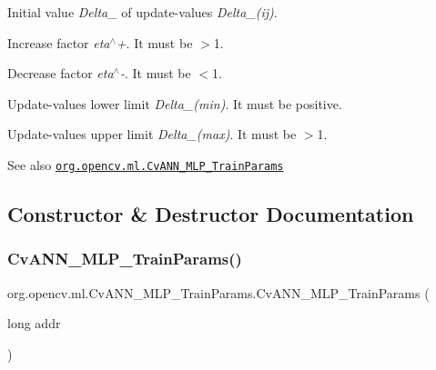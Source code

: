 {\ttfamily }

{\ttfamily }

{\ttfamily Initial value {\itshape Delta\+\_} of update-\/values {\itshape Delta\+\_\+(ij)}.}

{\ttfamily }

{\ttfamily }

{\ttfamily Increase factor {\itshape eta$^\wedge$+}. It must be $>$1.}

{\ttfamily }

{\ttfamily }

{\ttfamily Decrease factor {\itshape eta$^\wedge$-\/}. It must be $<$1.}

{\ttfamily }

{\ttfamily }

{\ttfamily Update-\/values lower limit {\itshape Delta\+\_\+(min)}. It must be positive.}

{\ttfamily }

{\ttfamily }

{\ttfamily Update-\/values upper limit {\itshape Delta\+\_\+(max)}. It must be $>$1.}

{\ttfamily }

{\ttfamily \begin{DoxySeeAlso}{See also}
\href{http://docs.opencv.org/modules/ml/doc/neural_networks.html#cvann-mlp-trainparams}{\tt org.\+opencv.\+ml.\+Cv\+A\+N\+N\+\_\+\+M\+L\+P\+\_\+\+Train\+Params} 
\end{DoxySeeAlso}
}

\subsection{Constructor \& Destructor Documentation}
\mbox{\label{classorg_1_1opencv_1_1ml_1_1_cv_a_n_n___m_l_p___train_params_a7c707d35771b5cdb3eeb45d02294b461}} 
\subsubsection{\texorpdfstring{Cv\+A\+N\+N\+\_\+\+M\+L\+P\+\_\+\+Train\+Params()}{CvANN\_MLP\_TrainParams()}\hspace{0.1cm}{\footnotesize\ttfamily [1/2]}}
{\footnotesize\ttfamily org.\+opencv.\+ml.\+Cv\+A\+N\+N\+\_\+\+M\+L\+P\+\_\+\+Train\+Params.\+Cv\+A\+N\+N\+\_\+\+M\+L\+P\+\_\+\+Train\+Params (\begin{DoxyParamCaption}\item[{long}]{addr }\end{DoxyParamCaption})\hspace{0.3cm}{\ttfamily [protected]}}

